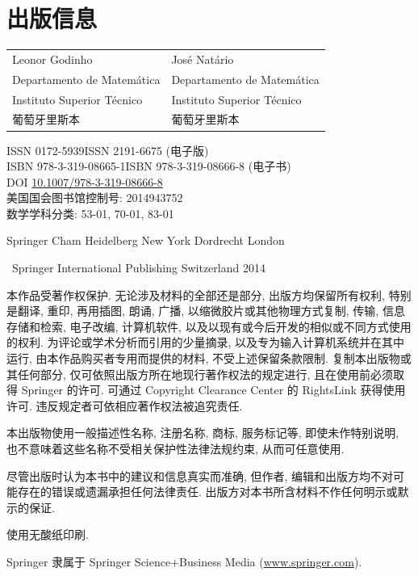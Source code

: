 \chapter*{出版信息}

\noindent\begin{tabular}{@{}l@{\qquad}l@{}}
Leonor Godinho & José Natário\\
Departamento de Matemática & Departamento de Matemática\\
Instituto Superior Técnico & Instituto Superior Técnico\\
葡萄牙里斯本 & 葡萄牙里斯本
\end{tabular}

\medskip
\noindent ISSN 0172-5939\qquad ISSN 2191-6675 (电子版)\\
ISBN 978-3-319-08665-1\qquad ISBN 978-3-319-08666-8 (电子书)\\
DOI \href{https://doi.org/10.1007/978-3-319-08666-8}{10.1007/978-3-319-08666-8}\\
美国国会图书馆控制号: 2014943752\\
数学学科分类: 53-01, 70-01, 83-01

\medskip
\noindent Springer Cham Heidelberg New York Dordrecht London

\noindent\textcopyright\ Springer International Publishing Switzerland 2014

本作品受著作权保护. 无论涉及材料的全部还是部分, 出版方均保留所有权利, 特别是翻译, 重印, 再用插图, 朗诵, 广播, 以缩微胶片或其他物理方式复制, 传输, 信息存储和检索, 电子改编, 计算机软件, 以及以现有或今后开发的相似或不同方式使用的权利. 为评论或学术分析而引用的少量摘录, 以及专为输入计算机系统并在其中运行, 由本作品购买者专用而提供的材料, 不受上述保留条款限制. 复制本出版物或其任何部分, 仅可依照出版方所在地现行著作权法的规定进行, 且在使用前必须取得 Springer 的许可. 可通过 Copyright Clearance Center 的 RightsLink 获得使用许可. 违反规定者可依相应著作权法被追究责任.

本出版物使用一般描述性名称, 注册名称, 商标, 服务标记等, 即使未作特别说明, 也不意味着这些名称不受相关保护性法律法规约束, 从而可任意使用.

尽管出版时认为本书中的建议和信息真实而准确, 但作者, 编辑和出版方均不对可能存在的错误或遗漏承担任何法律责任. 出版方对本书所含材料不作任何明示或默示的保证.

使用无酸纸印刷.

Springer 隶属于 Springer Science+Business Media (\url{www.springer.com}).
